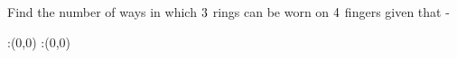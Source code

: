 



\question Find the number of ways in which $3$ rings can be worn on
$4$ fingers given that -


\watchout

\ifprintanswers
  \begin{marginfigure}
      :(0,0)
      :(0,0)
    \figdrawbegin{}
      \figdrawline [100,101]
    \figdrawend
    \figvisu{\figBoxA}{}{%
    }
    \centerline{\box\figBoxA}
  \end{marginfigure}
\fi 

